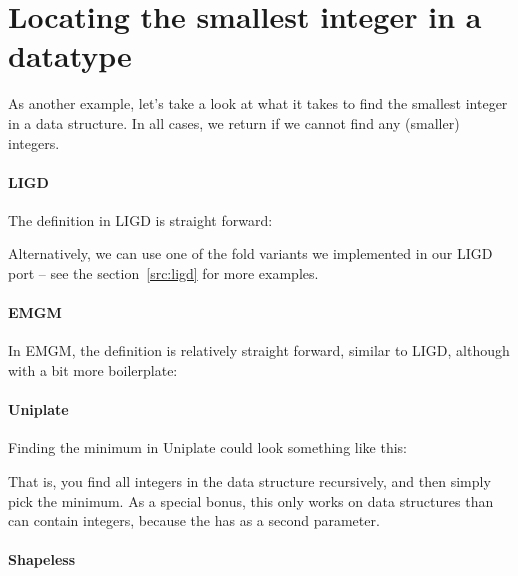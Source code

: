 \section{Locating the smallest integer in a datatype}
As another example, let's take a look at what it takes to find the smallest
integer in a data structure. In all cases, we return  if we cannot
find any (smaller) integers.

\paragraph{LIGD} The definition in LIGD is straight forward:


Alternatively, we can use one of the fold variants we implemented in our LIGD
port -- see the section~\ref{src:ligd} for more examples.

\paragraph{EMGM} In EMGM, the definition is relatively straight forward, similar
to LIGD, although with a bit more boilerplate:



\paragraph{Uniplate}

Finding the minimum in Uniplate could look something like this:



That is, you find all integers in the data structure recursively, and then
simply pick the minimum. As a special bonus, this only works on data structures
than can contain integers, because the  has  as a second
parameter.
\paragraph{Shapeless}
